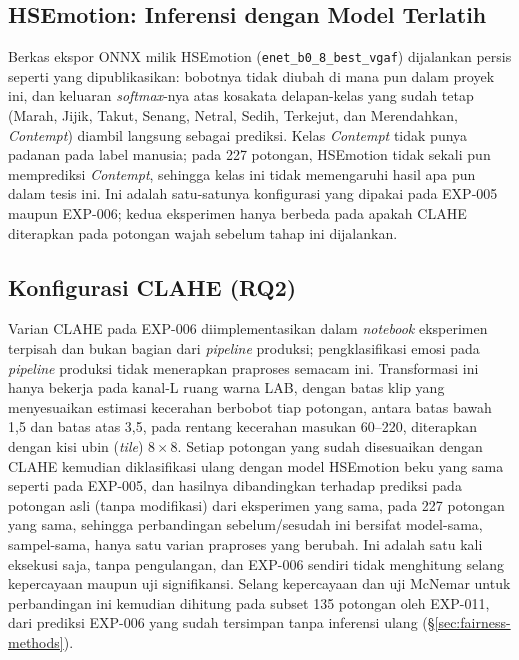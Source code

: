 \subsection{HSEmotion: Inferensi dengan Model Terlatih}

Berkas ekspor ONNX milik HSEmotion (\texttt{enet\_b0\_8\_best\_vgaf}) dijalankan persis seperti yang dipublikasikan: bobotnya tidak diubah di mana pun dalam proyek ini, dan keluaran \textit{softmax}-nya atas kosakata delapan-kelas yang sudah tetap (Marah, Jijik, Takut, Senang, Netral, Sedih, Terkejut, dan Merendahkan, \textit{Contempt}) diambil langsung sebagai prediksi. Kelas \textit{Contempt} tidak punya padanan pada label manusia; pada 227 potongan, HSEmotion tidak sekali pun memprediksi \textit{Contempt}, sehingga kelas ini tidak memengaruhi hasil apa pun dalam tesis ini. Ini adalah satu-satunya konfigurasi yang dipakai pada EXP-005 maupun EXP-006; kedua eksperimen hanya berbeda pada apakah CLAHE diterapkan pada potongan wajah sebelum tahap ini dijalankan.

\subsection{Konfigurasi CLAHE (RQ2)}
\label{sec:clahe-config}

Varian CLAHE pada EXP-006 diimplementasikan dalam \textit{notebook} eksperimen terpisah dan bukan bagian dari \textit{pipeline} produksi; pengklasifikasi emosi pada \textit{pipeline} produksi tidak menerapkan praproses semacam ini. Transformasi ini hanya bekerja pada kanal-L ruang warna LAB, dengan batas klip yang menyesuaikan estimasi kecerahan berbobot tiap potongan, antara batas bawah 1,5 dan batas atas 3,5, pada rentang kecerahan masukan 60--220, diterapkan dengan kisi ubin (\textit{tile}) $8\times8$. Setiap potongan yang sudah disesuaikan dengan CLAHE kemudian diklasifikasi ulang dengan model HSEmotion beku yang sama seperti pada EXP-005, dan hasilnya dibandingkan terhadap prediksi pada potongan asli (tanpa modifikasi) dari eksperimen yang sama, pada 227 potongan yang sama, sehingga perbandingan sebelum/sesudah ini bersifat model-sama, sampel-sama, hanya satu varian praproses yang berubah. Ini adalah satu kali eksekusi saja, tanpa pengulangan, dan EXP-006 sendiri tidak menghitung selang kepercayaan maupun uji signifikansi. Selang kepercayaan dan uji McNemar untuk perbandingan ini kemudian dihitung pada subset 135 potongan oleh EXP-011, dari prediksi EXP-006 yang sudah tersimpan tanpa inferensi ulang (\S\ref{sec:fairness-methods}).

